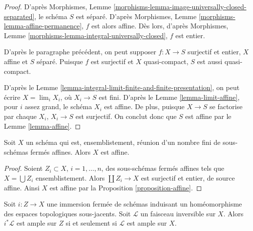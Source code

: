 \begin{proof}
D'après Morphismes, Lemme \ref{morphisms-lemma-image-universally-closed-separated},
le schéma $S$ est séparé. D'après
Morphismes, Lemme \ref{morphisms-lemma-affine-permanence},
$f$ est alors affine. Dès lors, d'après
Morphismes, Lemme \ref{morphisms-lemma-integral-universally-closed},
$f$ est entier.

\medskip\noindent
D'après le paragraphe précédent, on peut supposer $f : X \to S$
surjectif et entier, $X$ affine et $S$ séparé.
Puisque $f$ est surjectif et $X$ quasi-compact, $S$ est aussi
quasi-compact.

\medskip\noindent
D'après le Lemme \ref{lemma-integral-limit-finite-and-finite-presentation},
on peut écrire $X = \lim_i X_i$, où $X_i \to S$ est fini. D'après le
Lemme \ref{lemma-limit-affine},
pour $i$ assez grand, le schéma $X_i$ est affine.
De plus, puisque $X \to S$ se factorise par chaque $X_i$,
$X_i \to S$ est surjectif. On conclut donc que $S$ est affine par le
Lemme \ref{lemma-affine}.
\end{proof}

\begin{lemma}
\label{lemma-affines-glued-in-closed-affine}
Soit $X$ un schéma qui est, ensemblistement, réunion d'un
nombre fini de sous-schémas fermés affines. Alors $X$ est affine.
\end{lemma}

\begin{proof}
Soient $Z_i \subset X$, $i = 1, \ldots, n$, des sous-schémas fermés affines tels que
$X = \bigcup Z_i$ ensemblistement. Alors $\coprod Z_i \to X$ est surjectif
et entier, de source affine. Ainsi $X$ est affine par la
Proposition \ref{proposition-affine}.
\end{proof}

\begin{lemma}
\label{lemma-ample-on-reduction}
Soit $i : Z \to X$ une immersion fermée de schémas
induisant un homéomorphisme des espaces topologiques sous-jacents.
Soit $\mathcal{L}$ un faisceau inversible sur $X$.
Alors $i^*\mathcal{L}$ est ample sur $Z$ si et seulement si $\mathcal{L}$
est ample sur $X$.
\end{lemma}

